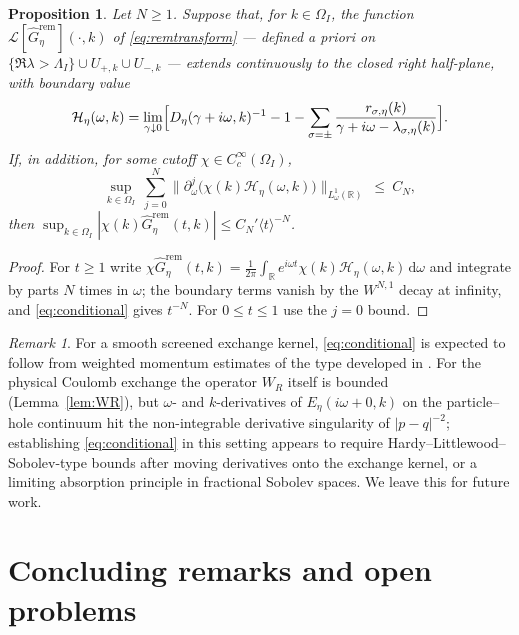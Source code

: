 \documentclass[11pt,a4paper]{amsart}
\newtheorem{proposition}[theorem]{Proposition}
\theoremstyle{definition}
\theoremstyle{remark}
\newtheorem{remark}[theorem]{Remark}
\newcommand{\R}{\mathbb{R}}
\newcommand{\dd}{\,\mathrm{d}}
\begin{document}
\begin{proposition}\label{prop:conditional}
Let $N\ge1$. Suppose that, for $k\in\Omega_I$, the function $\mathcal L[\widehat G^{\mathrm{rem}}_\eta](\cdot,k)$ of \eqref{eq:remtransform} --- defined a priori on $\{\Re\lambda>\Lambda_I\}\cup U_{+,k}\cup U_{-,k}$ --- extends continuously to the closed right half-plane, with boundary value
\[
\mathcal H_\eta(\omega,k)=\lim_{\gamma\downarrow0}\Bigl[D_\eta(\gamma+i\omega,k)^{-1}-1-\sum_{\sigma=\pm}\frac{r_{\sigma,\eta}(k)}{\gamma+i\omega-\lambda_{\sigma,\eta}(k)}\Bigr] .
\]
If, in addition, for some cutoff $\chi\in C_c^\infty(\Omega_I)$,
\begin{equation}\label{eq:conditional}
\sup_{k\in\Omega_I}\ \sum_{j=0}^{N}\bigl\|\partial_\omega^j\bigl(\chi(k)\mathcal H_\eta(\omega,k)\bigr)\bigr\|_{L^1_\omega(\R)}\ \le\ C_N ,
\end{equation}
then $\sup_{k\in\Omega_I}|\chi(k)\widehat G^{\mathrm{rem}}_\eta(t,k)|\le C_N'\langle t\rangle^{-N}$.
\end{proposition}

\begin{proof}
For $t\ge1$ write $\chi\widehat G^{\mathrm{rem}}_\eta(t,k)=\frac1{2\pi}\int_\R e^{i\omega t}\chi(k)\mathcal H_\eta(\omega,k)\dd\omega$ and integrate by parts $N$ times in $\omega$; the boundary terms vanish by the $W^{N,1}$ decay at infinity, and \eqref{eq:conditional} gives $t^{-N}$. For $0\le t\le1$ use the $j=0$ bound.
\end{proof}

\begin{remark}\label{rem:conditionalcoulomb}
For a smooth screened exchange kernel, \eqref{eq:conditional} is expected to follow from weighted momentum estimates of the type developed in \cite[Sections~3--4]{NY2}. For the physical Coulomb exchange the operator $W_R$ itself is bounded (Lemma~\ref{lem:WR}), but $\omega$- and $k$-derivatives of $E_\eta(i\omega+0,k)$ on the particle--hole continuum hit the non-integrable derivative singularity of $|p-q|^{-2}$; establishing \eqref{eq:conditional} in this setting appears to require Hardy--Littlewood--Sobolev-type bounds after moving derivatives onto the exchange kernel, or a limiting absorption principle in fractional Sobolev spaces. We leave this for future work.
\end{remark}

\section{Concluding remarks and open problems}\label{sec:conclusion}
\end{document}
